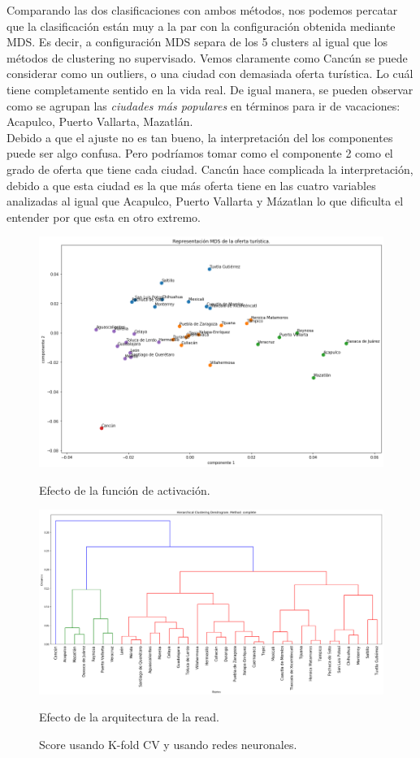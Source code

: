 \documentclass[11pt,letterpaper]{article}
\begin{document}
Comparando las dos clasificaciones con ambos métodos, nos podemos percatar que la clasificación están muy a la par con la configuración obtenida mediante MDS. Es decir, a configuración MDS separa de los 5 clusters al igual que los métodos de clustering no supervisado. Vemos claramente como Cancún se puede considerar como un outliers, o una ciudad con demasiada oferta turística. Lo cuál tiene completamente sentido en la vida real. De igual manera, se pueden observar como se agrupan las \textit{ciudades más populares} en términos para ir de vacaciones: Acapulco, Puerto Vallarta, Mazatlán. \\

Debido a que el ajuste no es tan bueno, la interpretación del los componentes puede ser algo confusa. Pero  podríamos tomar como el componente 2 como el grado de oferta que tiene cada ciudad. Cancún hace complicada la interpretación, debido a que esta ciudad es la que más oferta tiene en las cuatro variables analizadas al igual que Acapulco, Puerto Vallarta y Mázatlan lo que dificulta el entender por que esta en otro extremo.
\begin{figure}[H]
  \includegraphics[width=\linewidth]{figure/knn_oferta_c.png}
  \caption{Efecto de la función de activación.}\label{knn_oferta_c}
\endminipage\hfill
{}
  \includegraphics[width=\linewidth]{figure/herarquico_oferta_c.png}\caption{Efecto de la arquitectura de la read.}\label{arqui}
\endminipage
\caption{Score usando K-fold CV y usando redes neuronales.}\label{oferta_turistica}
\end{figure}
\end{document}
